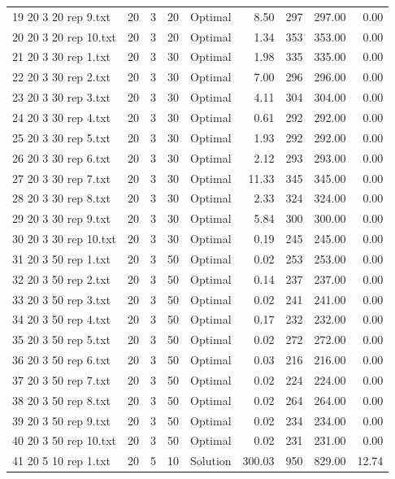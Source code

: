 \begin{longtable}{lrrllrrrr}
19 20 3 20 rep 9.txt & 20 & 3 & 20 & Optimal &  8.50 & 297 & 297.00 &  0.00\\
20 20 3 20 rep 10.txt & 20 & 3 & 20 & Optimal &  1.34 & 353 & 353.00 &  0.00\\
21 20 3 30 rep 1.txt & 20 & 3 & 30 & Optimal &  1.98 & 335 & 335.00 &  0.00\\
22 20 3 30 rep 2.txt & 20 & 3 & 30 & Optimal &  7.00 & 296 & 296.00 &  0.00\\
23 20 3 30 rep 3.txt & 20 & 3 & 30 & Optimal &  4.11 & 304 & 304.00 &  0.00\\
24 20 3 30 rep 4.txt & 20 & 3 & 30 & Optimal &  0.61 & 292 & 292.00 &  0.00\\
25 20 3 30 rep 5.txt & 20 & 3 & 30 & Optimal &  1.93 & 292 & 292.00 &  0.00\\
26 20 3 30 rep 6.txt & 20 & 3 & 30 & Optimal &  2.12 & 293 & 293.00 &  0.00\\
27 20 3 30 rep 7.txt & 20 & 3 & 30 & Optimal & 11.33 & 345 & 345.00 &  0.00\\
28 20 3 30 rep 8.txt & 20 & 3 & 30 & Optimal &  2.33 & 324 & 324.00 &  0.00\\
29 20 3 30 rep 9.txt & 20 & 3 & 30 & Optimal &  5.84 & 300 & 300.00 &  0.00\\
30 20 3 30 rep 10.txt & 20 & 3 & 30 & Optimal &  0.19 & 245 & 245.00 &  0.00\\
31 20 3 50 rep 1.txt & 20 & 3 & 50 & Optimal &  0.02 & 253 & 253.00 &  0.00\\
32 20 3 50 rep 2.txt & 20 & 3 & 50 & Optimal &  0.14 & 237 & 237.00 &  0.00\\
33 20 3 50 rep 3.txt & 20 & 3 & 50 & Optimal &  0.02 & 241 & 241.00 &  0.00\\
34 20 3 50 rep 4.txt & 20 & 3 & 50 & Optimal &  0.17 & 232 & 232.00 &  0.00\\
35 20 3 50 rep 5.txt & 20 & 3 & 50 & Optimal &  0.02 & 272 & 272.00 &  0.00\\
36 20 3 50 rep 6.txt & 20 & 3 & 50 & Optimal &  0.03 & 216 & 216.00 &  0.00\\
37 20 3 50 rep 7.txt & 20 & 3 & 50 & Optimal &  0.02 & 224 & 224.00 &  0.00\\
38 20 3 50 rep 8.txt & 20 & 3 & 50 & Optimal &  0.02 & 264 & 264.00 &  0.00\\
39 20 3 50 rep 9.txt & 20 & 3 & 50 & Optimal &  0.02 & 234 & 234.00 &  0.00\\
40 20 3 50 rep 10.txt & 20 & 3 & 50 & Optimal &  0.02 & 231 & 231.00 &  0.00\\
41 20 5 10 rep 1.txt & 20 & 5 & 10 & Solution & 300.03 & 950 & 829.00 & 12.74\\

\end{longtable}
